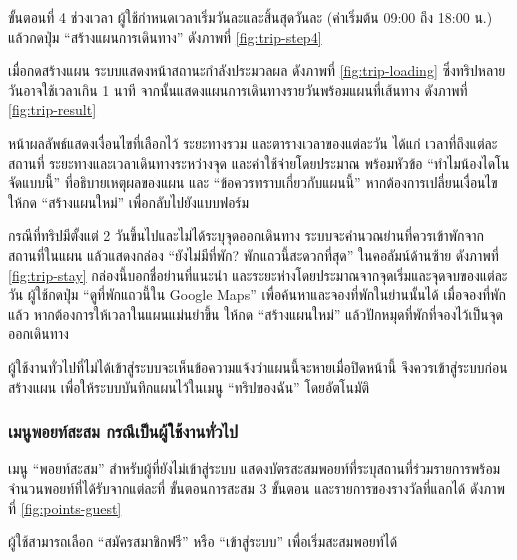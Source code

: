 ขั้นตอนที่ 4 ช่วงเวลา ผู้ใช้กำหนดเวลาเริ่มวันละและสิ้นสุดวันละ (ค่าเริ่มต้น 09:00 ถึง 18:00 น.) แล้วกดปุ่ม ``สร้างแผนการเดินทาง'' ดังภาพที่ \ref{fig:trip-step4}


เมื่อกดสร้างแผน ระบบแสดงหน้าสถานะกำลังประมวลผล ดังภาพที่ \ref{fig:trip-loading} ซึ่งทริปหลายวันอาจใช้เวลาเกิน 1 นาที จากนั้นแสดงแผนการเดินทางรายวันพร้อมแผนที่เส้นทาง ดังภาพที่ \ref{fig:trip-result}



หน้าผลลัพธ์แสดงเงื่อนไขที่เลือกไว้ ระยะทางรวม และตารางเวลาของแต่ละวัน ได้แก่ เวลาที่ถึงแต่ละสถานที่ ระยะทางและเวลาเดินทางระหว่างจุด และค่าใช้จ่ายโดยประมาณ พร้อมหัวข้อ ``ทำไมน้องไดโนจัดแบบนี้'' ที่อธิบายเหตุผลของแผน และ ``ข้อควรทราบเกี่ยวกับแผนนี้'' หากต้องการเปลี่ยนเงื่อนไข ให้กด ``สร้างแผนใหม่'' เพื่อกลับไปยังแบบฟอร์ม

กรณีที่ทริปมีตั้งแต่ 2 วันขึ้นไปและไม่ได้ระบุจุดออกเดินทาง ระบบจะคำนวณย่านที่ควรเข้าพักจากสถานที่ในแผน แล้วแสดงกล่อง ``ยังไม่มีที่พัก? พักแถวนี้สะดวกที่สุด'' ในคอลัมน์ด้านซ้าย ดังภาพที่ \ref{fig:trip-stay} กล่องนี้บอกชื่อย่านที่แนะนำ และระยะห่างโดยประมาณจากจุดเริ่มและจุดจบของแต่ละวัน ผู้ใช้กดปุ่ม ``ดูที่พักแถวนี้ใน Google Maps'' เพื่อค้นหาและจองที่พักในย่านนั้นได้ เมื่อจองที่พักแล้ว หากต้องการให้เวลาในแผนแม่นยำขึ้น ให้กด ``สร้างแผนใหม่'' แล้วปักหมุดที่พักที่จองไว้เป็นจุดออกเดินทาง


ผู้ใช้งานทั่วไปที่ไม่ได้เข้าสู่ระบบจะเห็นข้อความแจ้งว่าแผนนี้จะหายเมื่อปิดหน้านี้ จึงควรเข้าสู่ระบบก่อนสร้างแผน เพื่อให้ระบบบันทึกแผนไว้ในเมนู ``ทริปของฉัน'' โดยอัตโนมัติ

\subsubsection{เมนูพอยท์สะสม กรณีเป็นผู้ใช้งานทั่วไป}

เมนู ``พอยท์สะสม'' สำหรับผู้ที่ยังไม่เข้าสู่ระบบ แสดงบัตรสะสมพอยท์ที่ระบุสถานที่ร่วมรายการพร้อมจำนวนพอยท์ที่ได้รับจากแต่ละที่ ขั้นตอนการสะสม 3 ขั้นตอน และรายการของรางวัลที่แลกได้ ดังภาพที่ \ref{fig:points-guest}


ผู้ใช้สามารถเลือก ``สมัครสมาชิกฟรี'' หรือ ``เข้าสู่ระบบ'' เพื่อเริ่มสะสมพอยท์ได้

